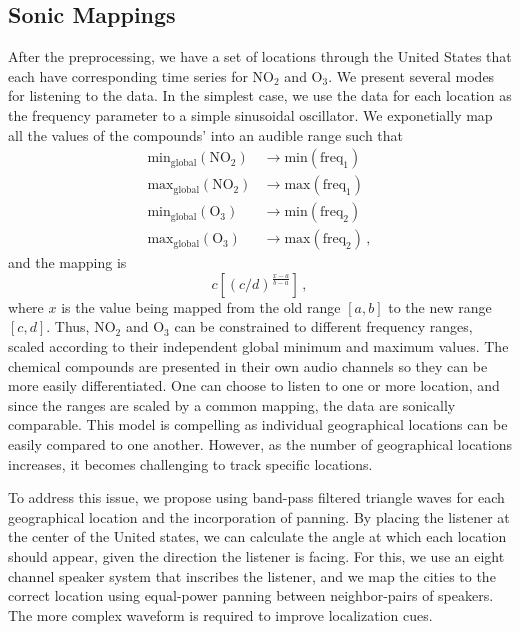 \documentclass[a4paper,10pt,oneside]{article}
\newcommand{\ce}[1]{$\mathrm{#1}$}
\begin{document}
\begin{sloppy}
\subsection{Sonic Mappings}
\label{sec:sonic-mappings}
After the preprocessing, we have a set of locations through the United States that each have corresponding time series for \ce{NO_2} and \ce{O_3}. We present several modes for listening to the data. In the simplest case, we use the data for each location as the frequency parameter to a simple sinusoidal oscillator.  We exponetially map all the values of the compounds' into an audible range such that 
\begin{align}
    \text{min}_{\text{global}}(\text{\ce{NO_2}}) &\rightarrow
    \text{min}(\text{freq}_1) \\
    \text{max}_{\text{global}}(\text{\ce{NO_2}}) &\rightarrow
    \text{max}(\text{freq}_1) \\
    \text{min}_{\text{global}}(\text{\ce{O_3}}) &\rightarrow
    \text{min}(\text{freq}_2) \\
    \text{max}_{\text{global}}(\text{\ce{O_3}}) &\rightarrow
    \text{max}(\text{freq}_2)
    \,,
\end{align}
and the mapping is
\begin{equation}
    c \left[(c/d)^{\frac{x-a}{b-a}}\right]\,,
\end{equation}
where $x$ is the value being mapped from the old range $[a, b]$ to the new range $[c, d]$.  Thus, \ce{NO_2} and \ce{O_3} can be constrained to different frequency ranges, scaled according to their independent global minimum and maximum values.  The chemical compounds are presented in their own audio channels so they can be more easily differentiated.  One can choose to listen to one or more location, and since the ranges are scaled by a common mapping, the data are sonically comparable. This model is compelling as individual geographical locations can be easily compared to one another. However, as the number of geographical locations increases, it becomes challenging to track specific locations. 

To address this issue, we propose using band-pass filtered triangle waves for each geographical location and the incorporation of panning. By placing the listener at the center of the United states, we can calculate the angle at which each location should appear, given the direction the listener is facing.  For this, we use an eight channel speaker system that inscribes the listener, and we map the cities to the correct location using equal-power panning between neighbor-pairs of speakers.  The more complex waveform is required to improve localization cues.  


\end{sloppy}
\end{document}
